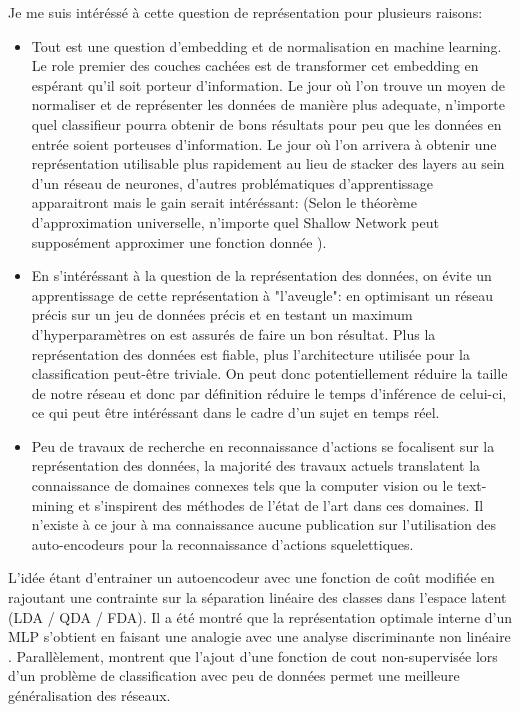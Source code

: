 Je me suis intéréssé à cette question de représentation pour plusieurs raisons:
\begin{itemize}
    \item Tout est une question d'embedding et de normalisation en machine learning. Le role premier des couches cachées est de transformer cet embedding en espérant qu'il soit porteur d'information. Le jour où l'on trouve un moyen de normaliser et de représenter les données de manière plus adequate, n'importe quel classifieur pourra obtenir de bons résultats pour peu que les données en entrée soient porteuses d'information. Le jour où l'on arrivera à obtenir une représentation utilisable plus rapidement au lieu de stacker des layers au sein d'un réseau de neurones, d'autres problématiques d'apprentissage apparaitront mais le gain serait intéréssant: (Selon le théorème d'approximation universelle, n'importe quel Shallow Network peut supposément approximer une fonction donnée \cite{universalapproxtheorm,scarselli1998universal}). 
    
    \item En s'intéréssant à la question de la représentation des données, on évite un apprentissage de cette représentation à "l'aveugle": en optimisant un réseau précis sur un jeu de données précis et en testant un maximum d'hyperparamètres on est assurés de faire un bon résultat. Plus la représentation des données est fiable, plus l'architecture utilisée pour la classification peut-être triviale.
    On peut donc potentiellement réduire la taille de notre réseau et donc par définition réduire le temps d'inférence de celui-ci, ce qui peut être intéréssant dans le cadre d'un sujet en temps réel.
    
    \item Peu de travaux de recherche en reconnaissance d'actions se focalisent sur la représentation des données, la majorité des travaux actuels translatent la connaissance de domaines connexes tels que la computer vision ou le text-mining et s'inspirent des méthodes de l'état de l'art dans ces domaines. Il n'existe à ce jour à ma connaissance aucune publication sur l'utilisation des auto-encodeurs pour la reconnaissance d'actions squelettiques.
\end{itemize}

L'idée étant d'entrainer un autoencodeur avec une fonction de coût modifiée en rajoutant une contrainte sur la séparation linéaire des classes dans l'espace latent (LDA / QDA / FDA). Il a été montré que la représentation optimale interne d'un MLP s'obtient en faisant une analogie avec une analyse discriminante non linéaire \cite{webb1990optimised}. Parallèlement, \cite{2020arXiv200312843B} montrent que l'ajout d'une fonction de cout non-supervisée lors d'un problème de classification avec peu de données permet une meilleure généralisation des réseaux.


